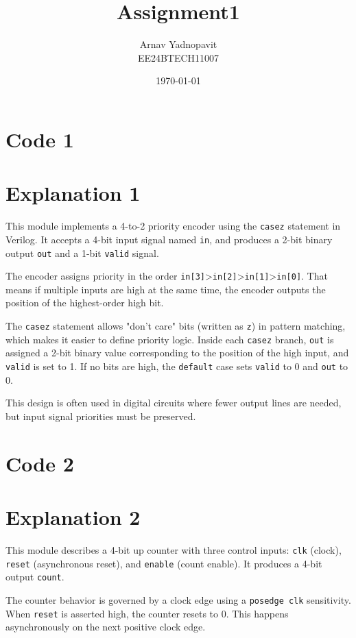 \documentclass{article}
\title{Assignment1}
\author{Arnav Yadnopavit\\EE24BTECH11007}
\date{\today}
\begin{document}
\maketitle


\section*{Code 1}


\section*{Explanation 1}
This module implements a 4-to-2 priority encoder using the \texttt{casez} statement in Verilog. It accepts a 4-bit input signal named \texttt{in}, and produces a 2-bit binary output \texttt{out} and a 1-bit \texttt{valid} signal.

The encoder assigns priority in the order \texttt{in[3]}\textgreater\texttt{in[2]}\textgreater\texttt{in[1]}\textgreater\texttt{in[0]}. That means if multiple inputs are high at the same time, the encoder outputs the position of the highest-order high bit.

The \texttt{casez} statement allows "don’t care" bits (written as \texttt{z}) in pattern matching, which makes it easier to define priority logic. Inside each \texttt{casez} branch, \texttt{out} is assigned a 2-bit binary value corresponding to the position of the high input, and \texttt{valid} is set to 1. If no bits are high, the \texttt{default} case sets \texttt{valid} to 0 and \texttt{out} to 0.

This design is often used in digital circuits where fewer output lines are needed, but input signal priorities must be preserved.

\section*{Code 2}


\section*{Explanation 2}This module describes a 4-bit up counter with three control inputs: \texttt{clk} (clock), \texttt{reset} (asynchronous reset), and \texttt{enable} (count enable). It produces a 4-bit output \texttt{count}.

The counter behavior is governed by a clock edge using a \texttt{posedge clk} sensitivity. When \texttt{reset} is asserted high, the counter resets to 0. This happens asynchronously on the next positive clock edge.
\end{document}
